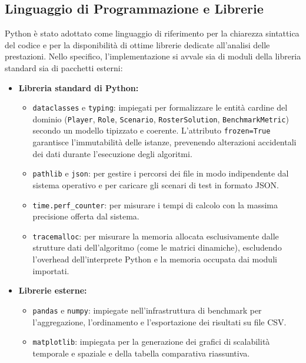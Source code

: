 \subsection{Linguaggio di Programmazione e Librerie}
Python è stato adottato come linguaggio di riferimento per la chiarezza sintattica del codice e per la disponibilità di ottime librerie dedicate all'analisi delle prestazioni.
Nello specifico, l'implementazione si avvale sia di moduli della libreria standard sia di pacchetti esterni:
\begin{itemize}
	\item \textbf{Libreria standard di Python:}
	      \begin{itemize}
		      \item \texttt{dataclasses} e \texttt{typing}: impiegati per formalizzare le entità cardine del dominio (\texttt{Player}, \texttt{Role}, \texttt{Scenario}, \texttt{RosterSolution}, \texttt{BenchmarkMetric}) secondo un modello tipizzato e coerente. L'attributo \texttt{frozen=True} garantisce l'immutabilità delle istanze, prevenendo alterazioni accidentali dei dati durante l'esecuzione degli algoritmi.
		      \item \texttt{pathlib} e \texttt{json}: per gestire i percorsi dei file in modo indipendente dal sistema operativo e per caricare gli scenari di test in formato JSON.
		      \item \texttt{time.perf\_counter}: per misurare i tempi di calcolo con la massima precisione offerta dal sistema.
		      \item \texttt{tracemalloc}: per misurare la memoria allocata esclusivamente dalle strutture dati dell'algoritmo (come le matrici dinamiche), escludendo l'overhead dell'interprete Python e la memoria occupata dai moduli importati.
	      \end{itemize}
	\item \textbf{Librerie esterne:}
	      \begin{itemize}
		      \item \texttt{pandas} e \texttt{numpy}: impiegate nell'infrastruttura di benchmark per l'aggregazione, l'ordinamento e l'esportazione dei risultati su file CSV.
		      \item \texttt{matplotlib}: impiegata per la generazione dei grafici di scalabilità temporale e spaziale e della tabella comparativa riassuntiva.
	      \end{itemize}
\end{itemize}

